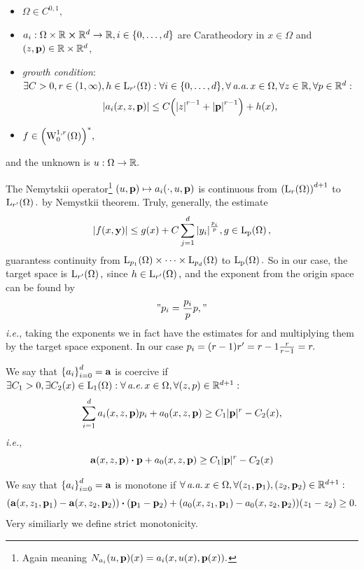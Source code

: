\documentclass{article}
\begin{document}
\begin{itemize}
	\item $\Omega \in C^{0,1},$
	\item $a_i: \Omega \times {\mathbb R} \cross {\mathbb R}^d \to {\mathbb R}, i \in \qty{0,\dots,d}$ are Caratheodory in $x \in \Omega$ and $\qty(z, \vb{p}) \in {\mathbb R} \times {\mathbb R}^d$,
		\item \textit{growth condition}: $\exists C>0, r \in (1,\infty), h \in \LpSet[r']{\Omega}: \forall i \in \qty{0, \dots, d}, \forall  \, \text{\textit{a.a.}} \, x\in \Omega, \forall z \in \R, \forall p \in \R^d:$
			\[
				\abs{a_i\qty(x,z,\vb{p})} \leq C\qty(\abs{z}^{r-1}+\abs{\vb{p}}^{r-1})+h(x),
			\]
		\item $f \in \qty(\WkpzeroSet[1][r]{\Omega})^{*},$
\end{itemize}
and the unknown is $u: \Omega \to {\mathbb R}.$
\begin{remark}
	The Nemytskii operator\footnote{Again meaning $N_{a_i}(u,\vb{p})(x) = a_i\qty(x, u(x), \vb{p}(x)).$} $(u,\vb{p}) \mapsto a_i\qty(\cdot, u, \vb{p})$ is continuous from $\qty(\LpSet[r]{\Omega})^{d+1}$ to $\LpSet[r']{\Omega}.$ by Nemystkii theorem. Truly, generally, the estimate
	\[
		\abs{f(x,\vb{y})} \leq g(x) + C \sum_{j=1}^d \abs{y_i}^{\frac{p_i}{p}}, g \in \LpSet{\Omega},
	\]
	guarantess continuity from $\LpSet[p_1]{\Omega} \times \dots \times \LpSet[p_d]{\Omega}$ to $\LpSet{\Omega}.$ So in our case, the target space is $\LpSet[r']{\Omega},$ since $h \in \LpSet[r']{\Omega},$ and the exponent from the origin space can be found by
	\[
		"p_i = \frac{p_i}{p} p,"
	\]
	\textit{i.e.}, taking the exponents we in fact have the estimates for and multiplying them by the target space exponent. In our case $p_i = \qty(r-1)r' = r-1 \frac{r}{r-1} = r.$ 
\end{remark}


\begin{definition}[Coercivity]
	We say that $\qty{a_i}_{i=0}^d = \vb{a}$ is coercive if $\exists C_1 > 0, \exists C_2(x) \in \LpSet[1]{\Omega}: \forall \, \text{\textit{a.e.}} \, x \in \Omega, \forall (z,p) \in \R^{d+1}:$
	\[
		\sum_{i=1}^d a_i\qty(x,z,\vb{p})p_i + a_0\qty(x,z,\vb{p}) \geq C_1 |\vb{p}|^r-C_2(x), 
	\]
	\textit{i.e.},
	\[
		\vb{a}\qty(x,z,\vb{p}) \vdot \vb{p} + a_0\qty(x,z,\vb{p}) \geq C_1 |\vb{p}|^r - C_2(x)
	\]
\end{definition}

\begin{definition}[Monotonicity]
	We say that $\qty{a_i}_{i=0}^d = \vb{a}$ is monotone if $\forall \, \text{\textit{a.a.}} \, x \in \Omega, \forall \qty(z_1, \vb{p}_1), \qty(z_2, \vb{p}_2) \in {\mathbb R}^{d+1}:$
	\[
		\qty(\vb{a}\qty(x,z_1,\vb{p}_1)-\vb{a}\qty(x,z_2,\vb{p}_2))\vdot (\vb{p}_1 - \vb{p}_2) + (a_0\qty(x,z_1,\vb{p}_1)-a_0\qty(x,z_2,\vb{p}_2))(z_1 - z_2) \geq 0.
	\]
	Very similiarly we define strict monotonicity.
\end{definition}
\end{document}
